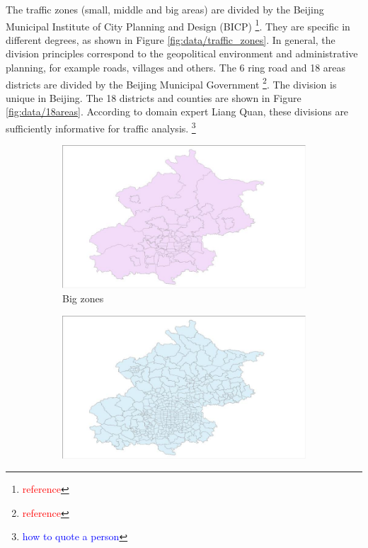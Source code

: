 \documentclass{article}
\newcommand{\selfnote}[1]{\footnote{\textcolor{red}{#1}}}
\newcommand{\technicalDoubt}[1]{\footnote{\textcolor{blue}{#1}}}
\begin{document}
The traffic zones (small, middle and big areas) are divided by the Beijing Municipal Institute of City Planning and Design (BICP) \selfnote{reference}. They are specific in different degrees, as shown in Figure \ref{fig:data/traffic_zones}. In general, the division principles correspond to the geopolitical environment and administrative planning, for example roads, villages and others. The 6 ring road and 18 areas districts are divided by the Beijing Municipal Government \selfnote{reference}. The division is unique in Beijing. The 18 districts and counties are shown in Figure \ref{fig:data/18areas}. According to domain expert Liang Quan, these divisions are sufficiently informative for traffic analysis. \technicalDoubt{how to quote a person}

\begin{figure}[H]
  \centering
  \begin{subfigure}[b]{.3\textwidth}
  	\centering
  	\includegraphics[width=\linewidth]{./images/big_traffic_zone.jpg}
  	\caption{Big zones}
  \end{subfigure}
  \begin{subfigure}[b]{.3\textwidth}
  	\centering
  	\includegraphics[width=\linewidth]{./images/middle_traffic_zone.jpg}

\end{subfigure}
\end{figure}
\end{document}
